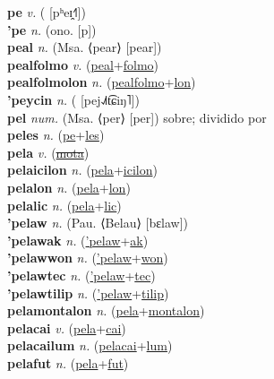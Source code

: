 \textbf{pe} \textit{v.} ( [pʰeɪ̯˧˥])
 \label{pe} \\
\textbf{'pe} \textit{n.} (ono. [p])
 \label{'pe} \\
\textbf{peal} \textit{n.} (Msa. ⟨pear⟩ [pear])
 \label{peal} \\
\textbf{pealfolmo} \textit{v.} (\hyperref[peal]{peal}+\hyperref[folmo]{folmo})
 \label{pealfolmo} \\
\textbf{pealfolmolon} \textit{n.} (\hyperref[pealfolmo]{pealfolmo}+\hyperref[lon]{lon})
 \label{pealfolmolon} \\
\textbf{'peycin} \textit{n.} ( [pej˨˩˦t͡ɕiŋ˥])
 \label{'peycin} \\
\textbf{pel} \textit{num.} (Msa. ⟨per⟩ [per])
sobre; dividido por \label{pel} \\
\textbf{peles} \textit{n.} (\hyperref[pe]{pe}+\hyperref[les]{les})
 \label{peles} \\
\textbf{pela} \textit{v.} (\hyperref[mota]{\sout{mota}})
 \label{pela} \\
\textbf{pelaicilon} \textit{n.} (\hyperref[pela]{pela}+\hyperref[icilon]{icilon})
 \label{pelaicilon} \\
\textbf{pelalon} \textit{n.} (\hyperref[pela]{pela}+\hyperref[lon]{lon})
 \label{pelalon} \\
\textbf{pelalic} \textit{n.} (\hyperref[pela]{pela}+\hyperref[lic]{lic})
 \label{pelalic} \\
\textbf{'pelaw} \textit{n.} (Pau. ⟨Belau⟩ [bɛlaw])
 \label{'pelaw} \\
\textbf{'pelawak} \textit{n.} (\hyperref['pelaw]{'pelaw}+\hyperref[ak]{ak})
 \label{'pelawak} \\
\textbf{'pelawwon} \textit{n.} (\hyperref['pelaw]{'pelaw}+\hyperref[won]{won})
 \label{'pelawwon} \\
\textbf{'pelawtec} \textit{n.} (\hyperref['pelaw]{'pelaw}+\hyperref[tec]{tec})
 \label{'pelawtec} \\
\textbf{'pelawtilip} \textit{n.} (\hyperref['pelaw]{'pelaw}+\hyperref[tilip]{tilip})
 \label{'pelawtilip} \\
\textbf{pelamontalon} \textit{n.} (\hyperref[pela]{pela}+\hyperref[montalon]{montalon})
 \label{pelamontalon} \\
\textbf{pelacai} \textit{v.} (\hyperref[pela]{pela}+\hyperref[cai]{cai})
 \label{pelacai} \\
\textbf{pelacailum} \textit{n.} (\hyperref[pelacai]{pelacai}+\hyperref[lum]{lum})
 \label{pelacailum} \\
\textbf{pelafut} \textit{n.} (\hyperref[pela]{pela}+\hyperref[fut]{fut})
